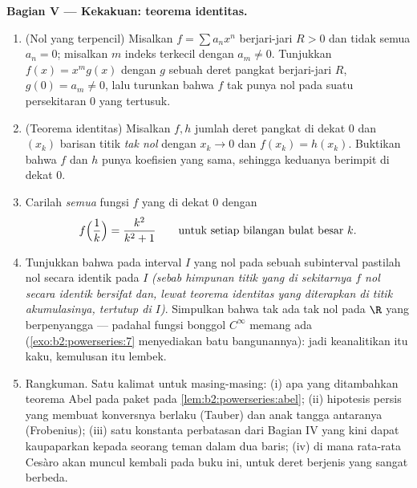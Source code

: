 \begin{problem}
\medskip
\noindent\textbf{Bagian V --- Kekakuan: teorema identitas.}
\begin{enumerate}[resume]
  \item (Nol yang terpencil) Misalkan $f = \sum a_nx^n$ berjari-jari $R
        > 0$ dan tidak semua $a_n = 0$; misalkan $m$ indeks terkecil
        dengan $a_m \neq 0$. Tunjukkan $f(x) = x^m g(x)$ dengan $g$
        sebuah deret pangkat berjari-jari $R$, $g(0) = a_m \neq 0$,
        lalu turunkan bahwa $f$ tak punya nol pada suatu
        persekitaran $0$ yang tertusuk.
  \item (Teorema identitas) Misalkan $f, h$ jumlah deret pangkat
        di dekat $0$ dan $(x_k)$ barisan titik \emph{tak nol}
        dengan $x_k \to 0$ dan $f(x_k) = h(x_k)$. Buktikan
        bahwa $f$ dan $h$ punya koefisien yang sama, sehingga
        keduanya berimpit di dekat $0$.
  \item Carilah \emph{semua} fungsi $f$ yang  di dekat $0$ dengan
        \[
        f\Bigl(\frac1k\Bigr) = \frac{k^2}{k^2+1}
        \qquad\text{untuk setiap bilangan bulat besar } k .
        \]
  \item Tunjukkan bahwa  pada interval  $I$
        yang nol pada sebuah subinterval pastilah nol secara identik pada
        $I$ \emph{(sebab himpunan titik yang di sekitarnya $f$ nol
        secara identik bersifat  dan, lewat teorema identitas
        yang diterapkan di titik akumulasinya, tertutup di $I$)}.
        Simpulkan bahwa tak ada  tak nol pada $\R$ yang
        berpenyangga  --- padahal fungsi bonggol $C^\infty$
        memang ada (\cref{exo:b2:powerseries:7} menyediakan
        batu bangunannya): jadi keanalitikan itu kaku, kemulusan itu
        lembek.
  \item Rangkuman. Satu kalimat untuk masing-masing: (i) apa yang
        ditambahkan teorema Abel pada paket  pada
        \cref{lem:b2:powerseries:abel}; (ii) hipotesis persis yang
        membuat konversnya berlaku (Tauber) dan
        anak tangga antaranya (Frobenius); (iii) satu konstanta
        perbatasan dari Bagian IV yang kini dapat kaupaparkan kepada
        seorang teman dalam dua baris; (iv) di mana rata-rata Cesàro
        akan muncul kembali pada buku ini, untuk deret berjenis yang
        sangat berbeda.

\end{enumerate}
\end{problem}
